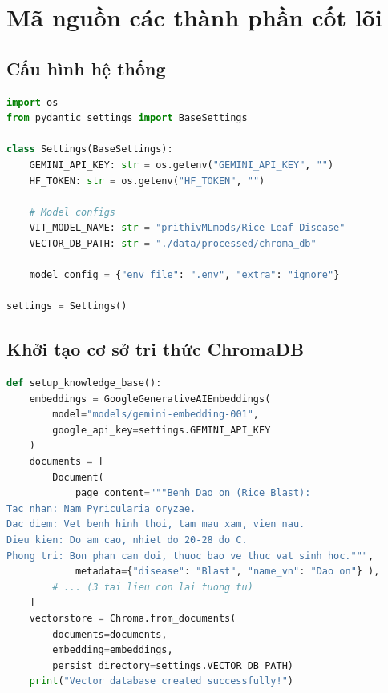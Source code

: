 \documentclass{uetgraduation}
\begin{document}
\chapter{Mã nguồn các thành phần cốt lõi}
\section{Cấu hình hệ thống}
\begin{lstlisting}[language=Python, caption={src/core/config.py --- Quản lý cấu hình bằng Pydantic Settings}, label={lst:config}]
import os
from pydantic_settings import BaseSettings

class Settings(BaseSettings):
    GEMINI_API_KEY: str = os.getenv("GEMINI_API_KEY", "")
    HF_TOKEN: str = os.getenv("HF_TOKEN", "")

    # Model configs
    VIT_MODEL_NAME: str = "prithivMLmods/Rice-Leaf-Disease"
    VECTOR_DB_PATH: str = "./data/processed/chroma_db"

    model_config = {"env_file": ".env", "extra": "ignore"}

settings = Settings()
\end{lstlisting}

\section{Khởi tạo cơ sở tri thức ChromaDB}
\begin{lstlisting}[language=Python, caption={src/core/knowledge\_setup.py --- Lập chỉ mục tài liệu bệnh học vào ChromaDB}, label={lst:knowledge}]
def setup_knowledge_base():
    embeddings = GoogleGenerativeAIEmbeddings(
        model="models/gemini-embedding-001",
        google_api_key=settings.GEMINI_API_KEY
    )
    documents = [
        Document(
            page_content="""Benh Dao on (Rice Blast):
Tac nhan: Nam Pyricularia oryzae.
Dac diem: Vet benh hinh thoi, tam mau xam, vien nau.
Dieu kien: Do am cao, nhiet do 20-28 do C.
Phong tri: Bon phan can doi, thuoc bao ve thuc vat sinh hoc.""",
            metadata={"disease": "Blast", "name_vn": "Dao on"} ),
        # ... (3 tai lieu con lai tuong tu)
    ]
    vectorstore = Chroma.from_documents(
        documents=documents,
        embedding=embeddings,
        persist_directory=settings.VECTOR_DB_PATH)
    print("Vector database created successfully!")
\end{lstlisting}
\end{document}
